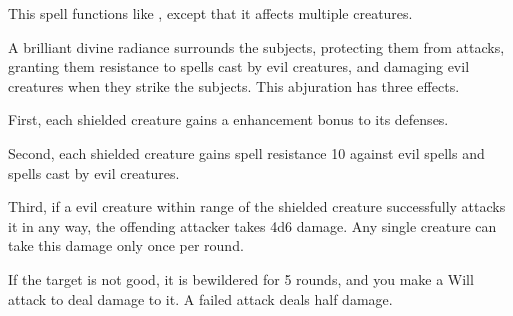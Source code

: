 \spellrng{\rngmed}
\begin{spelleffect}
  This spell functions like , except that it affects multiple creatures.
\end{spelleffect}

\begin{spelleffect}
  A brilliant divine radiance surrounds the subjects, protecting them from attacks, granting them resistance to spells cast by evil creatures, and damaging evil creatures when they strike the subjects. This abjuration has three effects.
  \par First, each shielded creature gains a  enhancement bonus to its defenses.
  \par Second, each shielded creature gains spell resistance 10 against evil spells and spells cast by evil creatures.
  \par Third, if a evil creature within \rngmed range of the shielded creature successfully attacks it in any way, the offending attacker takes 4d6 damage. Any single creature can take this damage only once per round.
\end{spelleffect}

\spellrng{\rngmed}
\begin{spelleffect}
    If the target is not good, it is bewildered for 5 rounds, and you make a Will attack to deal damage to it. A failed attack deals half damage.
\end{spelleffect}

